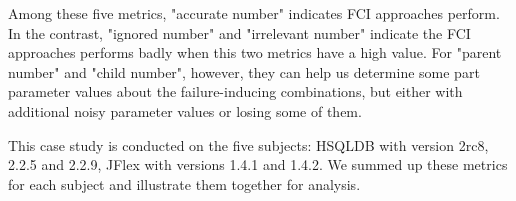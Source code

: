 \documentclass{sig-alternate}
\begin{document}
Among these five metrics,  "accurate number" indicates FCI approaches perform. In the contrast, "ignored number" and "irrelevant number" indicate the FCI approaches performs badly when this two metrics have a high value. For "parent number" and "child number", however, they can help us determine some part parameter values about the failure-inducing combinations, but either with additional noisy parameter values or losing some of them.


This case study is conducted on the five subjects: HSQLDB with version 2rc8, 2.2.5 and 2.2.9, JFlex with versions 1.4.1 and 1.4.2. We summed up these metrics for each subject and illustrate them together for analysis.


%
%
%
%
%
%
%
%
\end{document}
